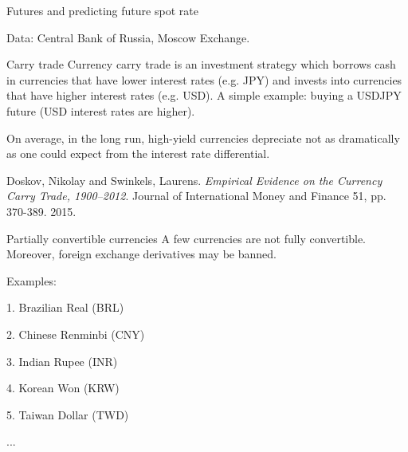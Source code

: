 \documentclass{beamer}
\begin{document}
\begin{frame}{Futures and predicting future spot rate}
\center
{}

\scriptsize Data: Central Bank of Russia, Moscow Exchange.
\end{frame}




\begin{frame}{Carry trade}
\justify
\alert{Currency carry trade} is an investment strategy which borrows cash in currencies that have lower interest rates (e.g. JPY) and invests into currencies that have higher interest rates (e.g. USD). A simple example: buying a USDJPY future (USD interest rates are higher).

\justify
On average, in the long run, high-yield currencies depreciate not as dramatically as one could expect from the interest rate differential.

\justify
Doskov, Nikolay and Swinkels, Laurens. \textit{Empirical Evidence on the Currency Carry Trade, 1900--2012}. Journal of International Money and Finance 51, pp. 370-389. 2015.

\end{frame}



\begin{frame}{Partially convertible currencies}
\justify
A few currencies are not fully convertible. Moreover, foreign exchange derivatives may be banned.

\justify
Examples:

1. Brazilian Real (BRL)

2. Chinese Renminbi (CNY)

3. Indian Rupee (INR)

4. Korean Won (KRW)

5. Taiwan Dollar (TWD)

...

\end{frame}
\end{document}
